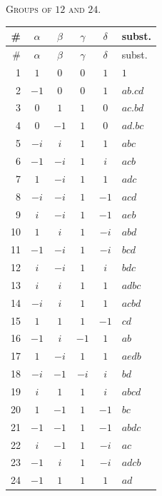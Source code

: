 \documentclass[11pt,a4paper]{article}
\begin{document}
\begin{center}
\textsc{Groups of $12$ and $24$.}\\[4pt]
\footnotesize
\begin{longtable}{r|c|c|c|c|l}
\# & $\alpha$ & $\beta$ & $\gamma$ & $\delta$ & subst.\\
\hline
\endfirsthead
\hline
\# & $\alpha$ & $\beta$ & $\gamma$ & $\delta$ & subst.\\
\hline
\endhead
1  & $1$  & $0$ & $0$ & $1$ & $1$\\
2  & $-1$ & $0$ & $0$ & $1$ & $ab.cd$\\
3  & $0$  & $1$ & $1$ & $0$ & $ac.bd$\\
4  & $0$  & $-1$& $1$ & $0$ & $ad.bc$\\
5  & $-i$ & $i$ & $1$ & $1$ & $abc$\\
6  & $-1$ & $-i$& $1$ & $i$ & $acb$\\
7  & $1$  & $-i$& $1$ & $1$ & $adc$\\
8  & $-i$ & $-i$& $1$ & $-1$& $acd$\\
9  & $i$  & $-i$& $1$ & $-1$& $aeb$\\
10 & $1$  & $i$ & $1$ & $-i$& $abd$\\
11 & $-1$ & $-i$& $1$ & $-i$& $bcd$\\
12 & $i$  & $-i$& $1$ & $i$  & $bdc$\\
\hline
13 & $i$  & $i$ & $1$ & $1$  & $adbc$\\
14 & $-i$ & $i$ & $1$ & $1$  & $acbd$\\
15 & $1$  & $1$ & $1$ & $-1$ & $cd$\\
16 & $-1$ & $i$ & $-1$& $1$  & $ab$\\
17 & $1$  & $-i$& $1$ & $1$  & $aedb$\\
18 & $-i$ & $-1$& $-i$ & $i$ & $bd$\\
19 & $i$  & $1$ & $1$ & $i$  & $abcd$\\
20 & $1$  & $-1$& $1$ & $-1$ & $bc$\\
21 & $-1$ & $-1$& $1$ & $-1$ & $abdc$\\
22 & $i$  & $-1$& $1$ & $-i$ & $ac$\\
23 & $-1$ & $i$ & $1$ & $-i$ & $adcb$\\
24 & $-1$ & $1$ & $1$ & $1$  & $ad$\\
\end{longtable}
\normalsize
\end{center}
\end{document}
